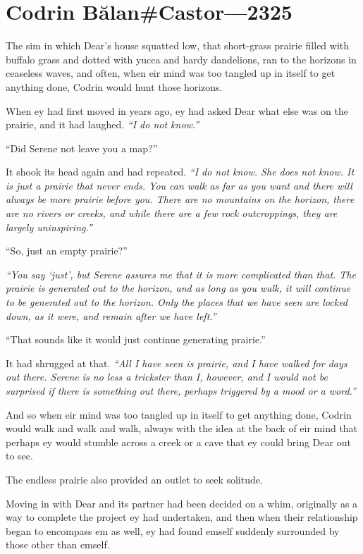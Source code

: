 \hypertarget{codrin-bux103lancastor-2325}{%
\chapter{Codrin Bălan\#Castor—2325}\label{codrin-bux103lancastor-2325}}

The sim in which Dear's house squatted low, that short-grass prairie filled with buffalo grass and dotted with yucca and hardy dandelions, ran to the horizons in ceaseless waves, and often, when eir mind was too tangled up in itself to get anything done, Codrin would hunt those horizons.

When ey had first moved in years ago, ey had asked Dear what else was on the prairie, and it had laughed. \emph{``I do not know.''}

``Did Serene not leave you a map?''

It shook its head again and had repeated. \emph{``I do not know. She does not know. It is just a prairie that never ends. You can walk as far as you want and there will always be more prairie before you. There are no mountains on the horizon, there are no rivers or creeks, and while there are a few rock outcroppings, they are largely uninspiring.''}

``So, just an empty prairie?''

\emph{``You say `just', but Serene assures me that it is more complicated than that. The prairie is generated out to the horizon, and as long as you walk, it will continue to be generated out to the horizon. Only the places that we have seen are locked down, as it were, and remain after we have left.''}

``That sounds like it would just continue generating prairie.''

It had shrugged at that. \emph{``All I have seen is prairie, and I have walked for days out there. Serene is no less a trickster than I, however, and I would not be surprised if there is something out there, perhaps triggered by a mood or a word.''}

And so when eir mind was too tangled up in itself to get anything done, Codrin would walk and walk and walk, always with the idea at the back of eir mind that perhaps ey would stumble across a creek or a cave that ey could bring Dear out to see.

The endless prairie also provided an outlet to seek solitude.

Moving in with Dear and its partner had been decided on a whim, originally as a way to complete the project ey had undertaken, and then when their relationship began to encompass em as well, ey had found emself suddenly surrounded by those other than emself.


